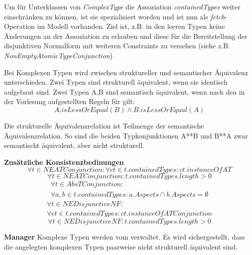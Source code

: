 Um für Unterklassen von \emph{ComplexType} die Assoziation \emph{containedTypes} weiter einschränken zu 
können, ist sie spezialisiert worden und ist nun als \emph{fetch}-Operation im Modell vorhanden. 
Ziel ist, z.B. in den leeren Typen keine Änderungen an der Assoziation zu erlauben und diese für die Bereitstellung 
der disjunktiven Normalform mit weiteren Constraints zu versehen (siehe z.B. \emph{NonEmptyAtomicTypeConjunction}) 

Bei Komplexen Typen wird zwischen struktureller und semantischer Äquivalenz unterschieden. Zwei Typen sind strukturell 
äquivalent, wenn sie identisch aufgebaut sind. Zwei Typen A,B sind semantisch äquivalent, wenn nach den in der Vorlesung 
aufgestellten Regeln für  gilt: 
\begin{equation}A.isLessOrEqual(B) \land B.isLessOrEqual(A)
\end{equation}

Die strukturelle Äquivalenzrelation ist Teilmenge der semantische Äquivalenzrelation.
So sind die beiden Typkonjunktionen A**B und B**A zwar semantischt äquivalent, aber nicht strukturell.

\textbf{Zusätzliche Konsistenzbedinungen} \newline
\begin{equation}\forall t \in NEATConjunction : 
	\forall ct \in t.containedTypes : ct.instanceOf AT
\end{equation}
\begin{equation}\forall t \in NEATConjunction : 
	t.containedTypes.length > 0
\end{equation}
\begin{equation}
\begin{split}
	\forall t \in AbsTConjunction :\\ 
	\forall a,b \in t.containedTypes : a.Aspects \cap b.Aspects = \emptyset
\end{split}
\end{equation}
\begin{equation}
\begin{split}
	\forall t \in NEDisjunctiveNF :\\ 
	\forall ct \in t.containedTypes : ct.instanceOf ATConjunction
\end{split}
\end{equation}
\begin{equation}\forall t \in NEDisjunctiveNF : 
	t.containedTypes.length > 0
\end{equation}


\textbf{Manager} \newline
Komplexe Typen werden vom  verwaltet. Es wird sichergestellt, dass 
die angelegten komplexen Typen paarweise nicht strukturell äquivalent sind. 

